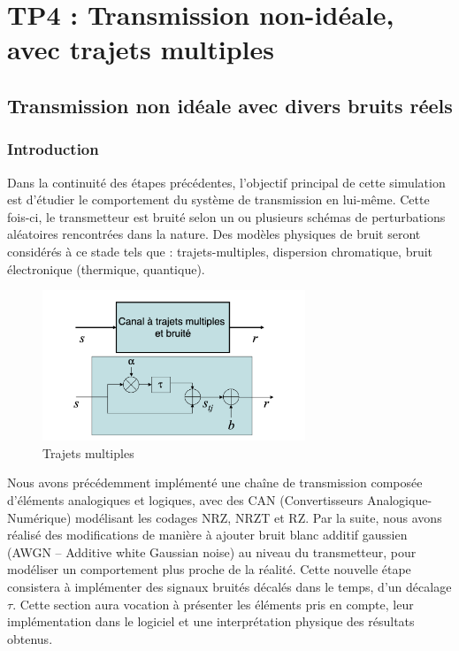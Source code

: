 \section{TP4 : Transmission non-idéale, avec trajets multiples}

\subsection{Transmission non idéale avec divers bruits réels}

\subsubsection{Introduction}

Dans la continuité des étapes précédentes, l’objectif principal de cette simulation est d'étudier le comportement du système de transmission en lui-même. Cette fois-ci, le transmetteur est bruité selon un ou plusieurs schémas de perturbations aléatoires rencontrées dans la nature. Des modèles physiques de bruit seront considérés à ce stade tels que : trajets-multiples, dispersion chromatique, bruit électronique (thermique, quantique).


\begin{figure}[H]
    \centering
    \includegraphics[width=0.7\textwidth]{img/etape4a_trajets_multiples.png}
    \caption{Trajets multiples}
    \label{fig:trajets_multiples}
\end{figure}

Nous avons précédemment implémenté une chaîne de transmission composée d'éléments analogiques et logiques, avec des CAN (Convertisseurs Analogique-Numérique) modélisant les codages NRZ, NRZT et RZ. Par la suite, nous avons réalisé des modifications de manière à ajouter bruit blanc additif gaussien (AWGN – Additive white Gaussian noise) au niveau du transmetteur, pour modéliser un comportement plus proche de la réalité. Cette nouvelle étape consistera à implémenter des signaux bruités décalés dans le temps, d'un décalage $\tau$. Cette section aura vocation à présenter les éléments pris en compte, leur implémentation dans le logiciel et une interprétation physique des résultats obtenus.

